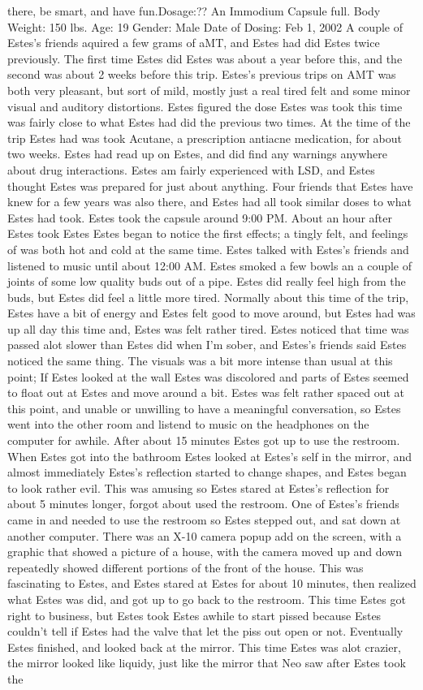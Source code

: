 \documentclass[12pt]{book}
\begin{document}
there, be smart, and have fun.Dosage:?? An Immodium Capsule full. Body Weight: 150 lbs. Age: 19 Gender: Male Date of Dosing: Feb 1, 2002 A couple of Estes's friends aquired a few grams of aMT, and Estes had did Estes twice previously. The first time Estes did Estes was about a year before this, and the second was about 2 weeks before this trip. Estes's previous trips on AMT was both very pleasant, but sort of mild, mostly just a real tired felt and some minor visual and auditory distortions. Estes figured the dose Estes was took this time was fairly close to what Estes had did the previous two times. At the time of the trip Estes had was took Acutane, a prescription antiacne medication, for about two weeks. Estes had read up on Estes, and did find any warnings anywhere about drug interactions. Estes am fairly experienced with LSD, and Estes thought Estes was prepared for just about anything. Four friends that Estes have knew for a few years was also there, and Estes had all took similar doses to what Estes had took. Estes took the capsule around 9:00 PM. About an hour after Estes took Estes Estes began to notice the first effects; a tingly felt, and feelings of was both hot and cold at the same time. Estes talked with Estes's friends and listened to music until about 12:00 AM. Estes smoked a few bowls an a couple of joints of some low quality buds out of a pipe. Estes did really feel high from the buds, but Estes did feel a little more tired. Normally about this time of the trip, Estes have a bit of energy and Estes felt good to move around, but Estes had was up all day this time and, Estes was felt rather tired. Estes noticed that time was passed alot slower than Estes did when I'm sober, and Estes's friends said Estes noticed the same thing. The visuals was a bit more intense than usual at this point; If Estes looked at the wall Estes was discolored and parts of Estes seemed to float out at Estes and move around a bit. Estes was felt rather spaced out at this point, and unable or unwilling to have a meaningful conversation, so Estes went into the other room and listend to music on the headphones on the computer for awhile. After about 15 minutes Estes got up to use the restroom. When Estes got into the bathroom Estes looked at Estes's self in the mirror, and almost immediately Estes's reflection started to change shapes, and Estes began to look rather evil. This was amusing so Estes stared at Estes's reflection for about 5 minutes longer, forgot about used the restroom. One of Estes's friends came in and needed to use the restroom so Estes stepped out, and sat down at another computer. There was an X-10 camera popup add on the screen, with a graphic that showed a picture of a house, with the camera moved up and down repeatedly showed different portions of the front of the house. This was fascinating to Estes, and Estes stared at Estes for about 10 minutes, then realized what Estes was did, and got up to go back to the restroom. This time Estes got right to business, but Estes took Estes awhile to start pissed because Estes couldn't tell if Estes had the valve that let the piss out open or not. Eventually Estes finished, and looked back at the mirror. This time Estes was alot crazier, the mirror looked like liquidy, just like the mirror that Neo saw after Estes took the 
\end{document}
